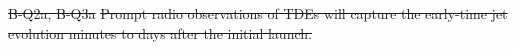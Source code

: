 \documentclass[12pt]{article}
\providecommand{\DIFdeltex}[1]{{\protect\color{red}\sout{#1}}}                      %
\providecommand{\DIFdelend}{} %
\providecommand{\DIFdelFL}[1]{\DIFdel{#1}} %
\providecommand{\DIFdel}[1]{\texorpdfstring{\DIFdeltex{#1}}{}} %
\DeclareRobustCommand{\DIFdelend}{\DIFOaddend \let\includegraphics\DIFOincludegraphics} %
\begin{document}
\DIFdelFL{B-Q2a, B-Q3a }%
\DIFdelFL{Prompt radio observations of TDEs will capture the early-time jet evolution minutes to days after the initial launch. }%
\DIFdelend %
\end{document}
